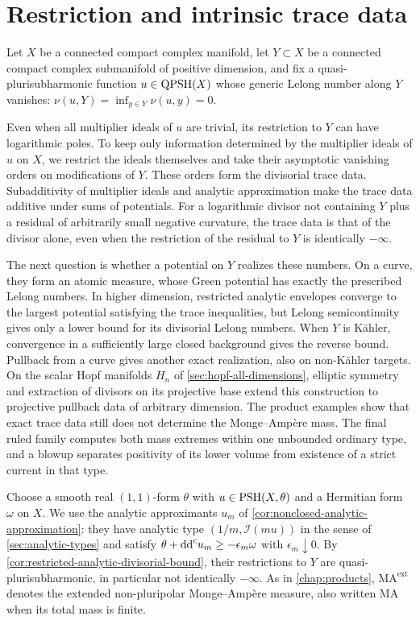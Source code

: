 \chapter{Restriction and intrinsic trace data}
\label{chap:trace-data}

Let $X$ be a connected compact complex manifold, let $Y\subset X$ be a connected compact complex submanifold of positive dimension, and fix a quasi-plurisubharmonic function $u\in\mathrm{QPSH}(X)$ whose generic Lelong number along $Y$ vanishes: $\nu(u,Y)=\inf_{y\in Y}\nu(u,y)=0$.

Even when all multiplier ideals of $u$ are trivial, its restriction to $Y$ can have logarithmic poles. To keep only information determined by the multiplier ideals of $u$ on $X$, we restrict the ideals themselves and take their asymptotic vanishing orders on modifications of $Y$. These orders form the divisorial trace data. Subadditivity of multiplier ideals and analytic approximation make the trace data additive under sums of potentials. For a logarithmic divisor not containing $Y$ plus a residual of arbitrarily small negative curvature, the trace data is that of the divisor alone, even when the restriction of the residual to $Y$ is identically $-\infty$.

The next question is whether a potential on $Y$ realizes these numbers. On a curve, they form an atomic measure, whose Green potential has exactly the prescribed Lelong numbers. In higher dimension, restricted analytic envelopes converge to the largest potential satisfying the trace inequalities, but Lelong semicontinuity gives only a lower bound for its divisorial Lelong numbers. When $Y$ is K\"ahler, convergence in a sufficiently large closed background gives the reverse bound. Pullback from a curve gives another exact realization, also on non-K\"ahler targets. On the scalar Hopf manifolds $H_n$ of \cref{sec:hopf-all-dimensions}, elliptic symmetry and extraction of divisors on its projective base extend this construction to projective pullback data of arbitrary dimension. The product examples show that exact trace data still does not determine the Monge--Amp\`ere mass. The final ruled family computes both mass extremes within one unbounded ordinary type, and a blowup separates positivity of its lower volume from existence of a strict current in that type.

Choose a smooth real $(1,1)$-form $\theta$ with $u\in\mathrm{PSH}(X,\theta)$ and a Hermitian form $\omega$ on $X$. We use the analytic approximants $u_m$ of \cref{cor:nonclosed-analytic-approximation}: they have analytic type $(1/m,\mathcal I(mu))$ in the sense of \cref{sec:analytic-types} and satisfy $\theta+\mathrm{dd}^{\mathrm{c}} u_m\geq-\epsilon_m\omega$ with $\epsilon_m\downarrow0$. By \cref{cor:restricted-analytic-divisorial-bound}, their restrictions to $Y$ are quasi-plurisubharmonic, in particular not identically $-\infty$. As in \cref{chap:products}, $\mathrm{MA}^{\mathrm{ext}}$ denotes the extended non-pluripolar Monge--Amp\`ere measure, also written $\mathrm{MA}$ when its total mass is finite.

